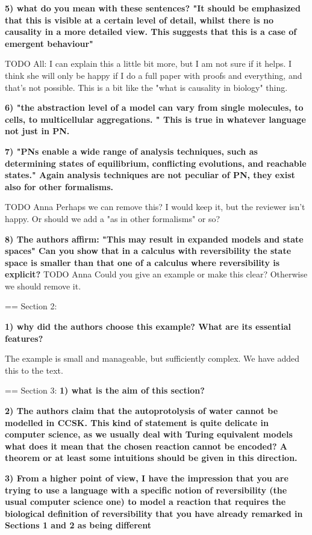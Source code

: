 \documentclass{article}
\begin{document}
\textbf{5) what do you mean with these sentences? "It should be emphasized that this is visible at a certain level of detail, whilst there is no causality in a more detailed view. This suggests that this is a case of emergent behaviour"}

TODO All: I can explain this a little bit more, but I am not sure if it helps. I think she will only be happy if I do a full paper with proofs and everything, and that's not possible. This is a bit like the "what is causality in biology" thing.

\textbf{6) "the abstraction level of a model can vary from single molecules, to cells, to multicellular aggregations. "
This is true in whatever language not just in PN.}

\textbf{7) "PNs enable a wide range of analysis techniques, such as determining states of equilibrium, conflicting evolutions, and reachable states."
Again analysis techniques are not peculiar of PN, they exist also for other formalisms.}

TODO Anna Perhaps we can remove this? I would keep it, but the reviewer isn't happy. Or should we add a "as in other formalisms" or so?

\textbf{8) The authors affirm: 
"This may result in expanded models and state spaces" Can you show that in a calculus with reversibility the state space is smaller than that one of a calculus where reversibility is explicit?}
TODO Anna Could you give an example or make this clear? Otherwise we should remove it.

== Section 2: 

\textbf{1) why did the authors choose this example? What are its essential features?}

The example is small and manageable, but sufficiently complex. We have added this to the text.


== Section 3:
\textbf{1) what is the aim of this section?}

\textbf{2) The authors claim that the autoprotolysis of water cannot be modelled in CCSK.
This kind of statement is quite delicate in computer science, as we usually deal with Turing equivalent models what does it mean that the chosen reaction cannot be encoded? A theorem or at least some intuitions should be given in this direction.}

\textbf{3) From a higher point of view, I have the impression that you are trying to use a language with a specific notion of reversibility (the usual computer science one) to model a reaction that requires the biological definition of reversibility that you have already remarked in Sections 1 and 2 as being different}
\end{document}
